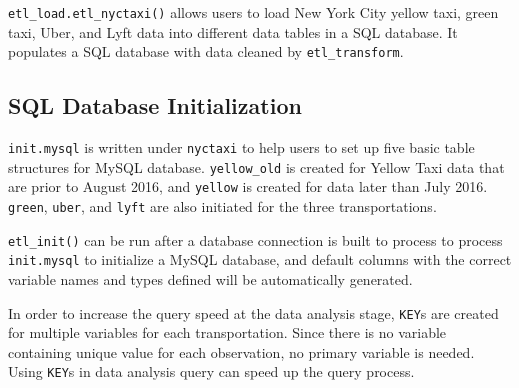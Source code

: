 \documentclass[12pt,twoside]{reedthesis}
\newenvironment{Shaded}{\begin{snugshade}}{\end{snugshade}}
\newcommand{\KeywordTok}[1]{\textcolor[rgb]{0.13,0.29,0.53}{\textbf{#1}}}
\newcommand{\DataTypeTok}[1]{\textcolor[rgb]{0.13,0.29,0.53}{#1}}
\newcommand{\DecValTok}[1]{\textcolor[rgb]{0.00,0.00,0.81}{#1}}
\newcommand{\StringTok}[1]{\textcolor[rgb]{0.31,0.60,0.02}{#1}}
\newcommand{\OperatorTok}[1]{\textcolor[rgb]{0.81,0.36,0.00}{\textbf{#1}}}
\newcommand{\NormalTok}[1]{#1}
\theoremstyle{definition}
\theoremstyle{definition}
\theoremstyle{definition}
\theoremstyle{remark}
\begin{document}
\texttt{etl\_load.etl\_nyctaxi()} allows users to load New York City
yellow taxi, green taxi, Uber, and Lyft data into different data tables
in a SQL database. It populates a SQL database with data cleaned by
\texttt{etl\_transform}.
\begin{Shaded}
\end{Shaded}
\subsection{SQL Database
Initialization}\label{sql-database-initialization}

\texttt{init.mysql} is written under \texttt{nyctaxi} to help users to
set up five basic table structures for MySQL database.
\texttt{yellow\_old} is created for Yellow Taxi data that are prior to
August 2016, and \texttt{yellow} is created for data later than July
2016. \texttt{green}, \texttt{uber}, and \texttt{lyft} are also
initiated for the three transportations.

\texttt{etl\_init()} can be run after a database connection is built to
process to process \texttt{init.mysql} to initialize a MySQL database,
and default columns with the correct variable names and types defined
will be automatically generated.
\begin{Shaded}
\end{Shaded}
In order to increase the query speed at the data analysis stage,
\texttt{KEY}s are created for multiple variables for each
transportation. Since there is no variable containing unique value for
each observation, no primary variable is needed. Using \texttt{KEY}s in
data analysis query can speed up the query process.
\end{document}
